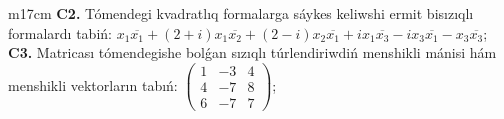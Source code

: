 \documentclass{article}
\begin{document}
\begin{tabular}{m{17cm}}
\textbf{C2.} Tómendegi kvadratlıq formalarga sáykes keliwshi ermit bisızıqlı formalardı tabiń: \(x_{1}\overline{x_{1}} + (2 + i)x_{1}\overline{x_{2}} + (2 - i)x_{2}\overline{x_{1}} + ix_{1}\overline{x_{3}} - ix_{3}\overline{x_{1}} - x_{3}\overline{x_{3}}\); \\
\textbf{C3.} Matricası tómendegishe bolǵan sızıqlı túrlendiriwdiń menshikli mánisi hám menshikli vektorların tabıń: \(\begin{pmatrix} 1 & - 3 & 4 \\ 4 & - 7 & 8 \\ 6 & - 7 & 7 \end{pmatrix}\); \\

\end{tabular}
\vspace{1cm}
\end{document}
